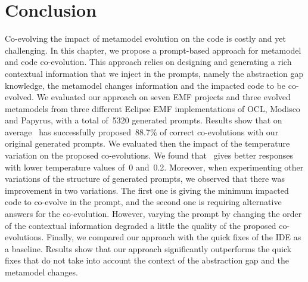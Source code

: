 \section{Conclusion}
\label{ch3_conclu}
Co-evolving the impact of metamodel evolution on the code is costly and yet challenging. In this chapter, we propose a prompt-based approach for metamodel and code co-evolution. This approach relies on designing and generating a rich contextual information that we inject in the prompts, namely the abstraction gap knowledge, the metamodel changes information and  the impacted code to be co-evolved.
We evaluated our approach on seven EMF projects and three evolved metamodels from three different Eclipse EMF implementations of OCL, Modisco and Papyrus, with a total of~5320 generated prompts. Results show that on average \LLM~has successfully proposed~88.7\% of correct co-evolutions with our original generated prompts. We evaluated then the impact of the temperature variation on the proposed co-evolutions. We found that \LLM~gives better responses with lower temperature values of~0 and~0.2. 
Moreover, when experimenting other variations of the structure of generated prompts, we observed that there was improvement in two variations. 
The first one is giving the minimum impacted code to co-evolve in the prompt, and the second one is requiring alternative answers for the co-evolution. However, varying the prompt by changing the order of the contextual information degraded a little the quality of the proposed co-evolutions. 
Finally, we compared our approach with the quick fixes of the IDE as a baseline. Results show that our approach significantly outperforms the quick fixes that do not take into account the context of the abstraction gap and the metamodel changes.



